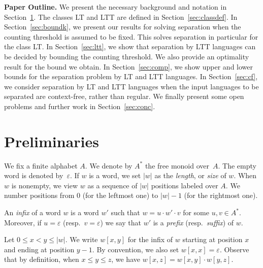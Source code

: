 \documentclass{LMCS}
\newcommand\mypar[1]{\par\medskip\noindent\textbf{#1}}
\newcommand{\lt}{\textup{LT}\xspace}
\newcommand{\ltt}{\textup{LTT}\xspace}
\let\le\leqslant
\let\leq\leqslant
\theoremstyle{plain}
\begin{document}
\mypar{Paper Outline.} We present the necessary background and notation in
Section~\ref{sec:prelims}. The classes \lt and \ltt are defined in
Section~\ref{sec:classdef}. In Section~\ref{sec:boundk}, we present our
results for solving separation when the counting threshold is assumed to be fixed.
This solves separation in particular for the class \lt. In
Section~\ref{sec:ltt}, we show that separation by \ltt languages can be
decided by bounding the counting threshold. We also provide an optimality
result for the bound we obtain. In Section~\ref{sec:comp}, we show upper and lower
bounds for the separation problem by \lt and \ltt languages. In
Section~\ref{sec:cf}, we consider separation by \lt and \ltt languages when the input
languages to be separated are context-free, rather than regular. We finally present
some open problems and further work in Section~\ref{sec:conc}.






\section{Preliminaries}
\label{sec:prelims}
\makeatletter{} We fix a finite alphabet
$A$. We denote by $A^*$ the free monoid over~$A$. The empty word is denoted by~$\varepsilon$. If $w$ is a word, we
set $|w|$ as the \emph{length}, or \emph{size} of $w$. When $w$ is nonempty, we view
$w$ as a sequence of $|w|$ positions labeled over $A$. We number
positions from $0$ (for the leftmost one) to $|w|-1$ (for the
rightmost one).

\smallskip
{} An \emph{infix} of a
word $w$ is a word $w'$ such that $w=u \cdot w' \cdot v$ for some $u,v
\in A^{*}$. Moreover, if $u=\varepsilon$ (resp.~$v=\varepsilon$) we
say that $w'$ is a \emph{prefix} (resp.~\emph{suffix}) of $w$.

Let $0\le x < y \leq |w|$. We write $w[x,y]$ for the infix of $w$ starting at
position $x$ and ending at position $y-1$. By convention, we also set
$w[x,x] = \varepsilon$. Observe that by definition, when $x \le y \le
z$, we have $w[x,z] = w[x,y] \cdot w[y,z]$. 
\end{document}
